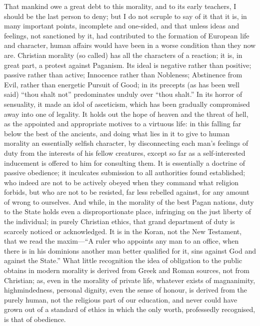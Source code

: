 \documentclass[11pt,openany]{book}
\begin{document}
That mankind owe a great debt to this morality, and to its early teachers, I should be the last person to deny; but I do not scruple to say of it that it is, in many important points, incomplete and one-sided, and that unless ideas and feelings, not sanctioned by it, had contributed to the formation of European life and character, human affairs would have been in a worse condition than they now are. Christian morality (so called) has all the characters of a reaction; it is, in great part, a protest against Paganism. Its ideal is negative rather than positive; passive rather than active; Innocence rather than Nobleness; Abstinence from Evil, rather than energetic Pursuit of Good; in its precepts (as has been well said) ``thou shalt not'' predominates unduly over ``thou shalt.'' In its horror of sensuality, it made an idol of asceticism, which has been gradually compromised away into one of legality. It holds out the hope of heaven and the threat of hell, as the appointed and appropriate motives to a virtuous life: in this falling far below the best of the ancients, and doing what lies in it to give to human morality an essentially selfish character, by disconnecting each man's feelings of duty from the interests of his fellow creatures, except so far as a self-interested inducement is offered to him for consulting them. It is essentially a doctrine of passive obedience; it inculcates submission to all authorities found established; who indeed are not to be actively obeyed when they command what religion forbids, but who are not to be resisted, far less rebelled against, for any amount of wrong to ourselves. And while, in the morality of the best Pagan nations, duty to the State holds even a disproportionate place, infringing on the just liberty of the individual; in purely Christian ethics, that grand department of duty is scarcely noticed or acknowledged. It is in the Koran, not the New Testament, that we read the maxim---``A ruler who appoints any man to an office, when there is in his dominions another man better qualified for it, sins against God and against the State.'' What little recognition the idea of obligation to the public obtains in modern morality is derived from Greek and Roman sources, not from Christian; as, even in the morality of private life, whatever exists of magnanimity, highmindedness, personal dignity, even the sense of honour, is derived from the purely human, not the religious part of our education, and never could have grown out of a standard of ethics in which the only worth, professedly recognised, is that of obedience.
\end{document}
